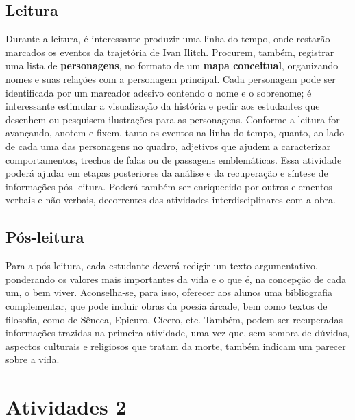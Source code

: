 \documentclass[12pt]{extarticle}
\begin{document}
\subsection{Leitura}


Durante a leitura, é interessante produzir uma linha do
tempo, onde restarão marcados os eventos da trajetória de Ivan Ilitch.
Procurem, também, registrar uma lista de \textbf{personagens}, no
formato de um \textbf{mapa conceitual}, organizando nomes e suas
relações com a personagem principal. Cada personagem pode ser
identificada por um marcador adesivo contendo o nome e o sobrenome; é
interessante estimular a visualização da história e pedir aos estudantes
que desenhem ou pesquisem ilustrações para as personagens. Conforme a
leitura for avançando, anotem e fixem, tanto os eventos na linha do
tempo, quanto, ao lado de cada uma das personagens no quadro, adjetivos
que ajudem a caracterizar comportamentos, trechos de falas ou de
passagens emblemáticas. Essa atividade poderá ajudar em etapas
posteriores da análise e da recuperação e síntese de informações
pós-leitura. Poderá também ser enriquecido por outros elementos verbais
e não verbais, decorrentes das atividades interdisciplinares com a obra.

\subsection{Pós-leitura}


Para a pós leitura, cada estudante deverá redigir um texto
argumentativo, ponderando os valores mais importantes da vida e o que é,
na concepção de cada um, o bem viver. Aconselha-se, para isso, oferecer
aos alunos uma bibliografia complementar, que pode incluir obras da
poesia árcade, bem como textos de filosofia, como de Sêneca, Epicuro,
Cícero, etc. Também, podem ser recuperadas informações trazidas na
primeira atividade, uma vez que, sem sombra de dúvidas, aspectos
culturais e religiosos que tratam da morte, também indicam um parecer
sobre a vida.

\section{Atividades 2}
\end{document}
